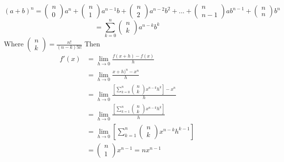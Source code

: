 \documentclass[]{article}
\begin{document}
	$$
		(a+b)^n=\left(\begin{array}{c}{n}\\{0}\end{array}\right)a^n+\left(\begin{array}{c}{n}\\{1}\end{array}\right)a^{n-1}b+\left(\begin{array}{c}{n}\\{2}\end{array}\right)a^{n-2}b^2+...+\left(\begin{array}{c}{n}\\{n-1}\end{array}\right)ab^{n-1}+\left(\begin{array}{c}{n}\\{n}\end{array}\right)b^n
	$$
	$$
		=\sum^{n}_{k=0}\left(\begin{array}{c}{n}\\{k}\end{array}\right)a^{n-k}b^k
	$$
	Where $\left(\begin{array}{c}{n}\\{k}\end{array}\right)=\frac{n!}{(n-k)!k!}$
	Then
	\begin{align*}
		f'(x)&=\lim_{h\to 0}\frac{f(x+h)-f(x)}{h}\\
		&=\lim_{h\to 0}\frac{x+h)^n-x^n}{h}\\
		&=\lim_{h\to 0}\frac{ \left[ \sum\limits^n_{k=0}\left(\begin{array}{c}{n}\\{k}\end{array}\right) x^{n-k}h^k \right] -x^n}{h}\\
		&=\lim_{h\to 0}\frac{ \left[ \sum\limits^n_{k=1}\left(\begin{array}{c}{n}\\{k}\end{array}\right) x^{n-k}h^k \right]}{h}\\
		&=\lim_{h\to 0}\left[ \sum\limits^n_{k=1}\left(\begin{array}{c}{n}\\{k}\end{array}\right) x^{n-k}h^{k-1} \right]\\
		&=\left(\begin{array}{c}{n}\\{1}\end{array}\right)x^{n-1}=nx^{n-1}
	\end{align*}
\end{document}
